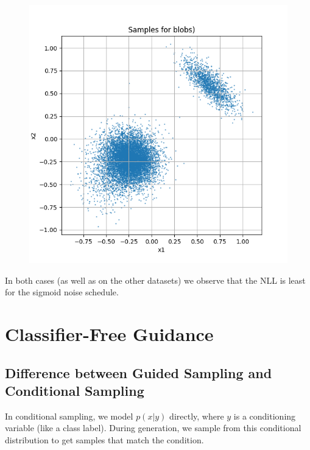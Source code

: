 \documentclass[a4paper,12pt]{article}
\begin{document}
\begin{figure}[H]
\begin{minipage}{0.3\textwidth}
  \end{minipage}
  \begin{minipage}{0.3\textwidth}
      \centering
      \includegraphics[width=\linewidth]{images/Samples for ddpm_2_200_0.0001_0.02_blobs_sigmoid.png}
  \end{minipage}
\end{figure}


In both cases (as well as on the other datasets) we observe that the NLL is least for the sigmoid noise schedule.


\clearpage


\section*{Classifier-Free Guidance}

\subsection*{Difference between Guided Sampling and Conditional Sampling}
In conditional sampling, we model $p(x|y)$ directly, where $y$ is a conditioning variable (like a class label). During generation, we sample from this conditional distribution to get samples that match the condition.
\end{document}
